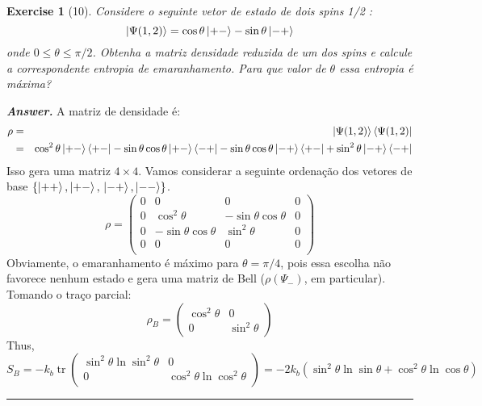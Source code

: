 \documentclass[12pt]{article}
\def\be{\begin{equation}}
\def\ee{\end{equation}}
\def\bea{\begin{eqnarray*}}
\def\eea{\end{eqnarray*}}
\newtheorem{exercise}{Exercise}
\newenvironment{answer}{\noindent\textbf{\textit{Answer.}} \normalfont }{\par\noindent\rule{\textwidth}{0.4pt}}
\DeclareMathOperator{\tr}{tr}
\begin{document}
	\begin{exercise}[10]
		Considere o seguinte vetor de estado de dois spins 1/2 :
		\be
			\ket{\Psi(1, 2)} = \cos\theta\ket{+-} - \sin\theta\ket{-+}	
		\ee
		onde $0\leq\theta\leq\pi/2$. Obtenha a matriz densidade reduzida de um dos spins e calcule a correspondente entropia de emaranhamento. Para que valor de $\theta$ essa entropia é máxima?
	\end{exercise}
	\begin{answer}
		A matriz de densidade é:
		\bea
			\rho &=& \ket{\Psi(1, 2)}\bra{\Psi(1, 2)} \\ 
				&=& \cos^2\theta\ket{+-}\bra{+-} - \sin\theta\cos\theta\ket{+-}\bra{-+} - \sin\theta\cos\theta\ket{-+}\bra{+-} + \sin^2\theta\ket{-+}\bra{-+}
		\eea
		Isso gera uma matriz $4\times 4$. Vamos considerar a seguinte ordenação dos vetores de base $\{ \ket{++}, \ket{+-},\\ \ket{-+}, \ket{--}\}$. 
		\be
			\rho = 
			\begin{pmatrix}
				0 & 0 & 0 & 0 \\
				0 & \cos^2\theta & -\sin\theta\cos\theta & 0 \\
				0 & -\sin\theta\cos\theta & \sin^2\theta & 0 \\
				0 & 0 & 0 & 0 \\
			\end{pmatrix}
		\ee
		Obviamente, o emaranhamento é máximo para $\theta=\pi/4$, pois essa escolha não favorece nenhum estado e gera uma matriz de Bell ($\rho(\Psi_-)$, em particular). Tomando o traço parcial:
		\be
			\rho_B = 
			\begin{pmatrix}
				\cos^2\theta & 0 \\
				0 & \sin^2\theta
			\end{pmatrix}
		\ee
		Thus,
		\be
			S_B = -k_b\tr\begin{pmatrix}
				\sin^2\theta\ln\sin^2\theta & 0 \\
				0 & \cos^2\theta\ln\cos^2\theta \\
			\end{pmatrix} = - 2k_b (\sin^2\theta\ln\sin\theta +\cos^2\theta\ln\cos\theta)
		\ee
		
	\end{answer}
	
\end{document}
